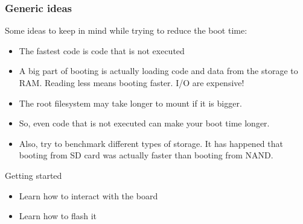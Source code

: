 \begin{frame}
\frametitle{Generic ideas}
Some ideas to keep in mind while trying to reduce the boot time:
\begin{itemize}
\item The fastest code is code that is not executed
\item A big part of booting is actually loading code and data from the
      storage to RAM. Reading less means booting faster. I/O are
      expensive!
\item The root filesystem may take longer to mount if it is bigger.
\item So, even code that is not executed can make your boot time
      longer.
\item Also, try to benchmark different types of storage. It has
      happened that booting from SD card was actually faster than
      booting from NAND.
\end{itemize}
\end{frame}

\setuplabframe
{Getting started}
{
\begin{itemize}
\item Learn how to interact with the board
\item Learn how to flash it 
\end{itemize}
}

